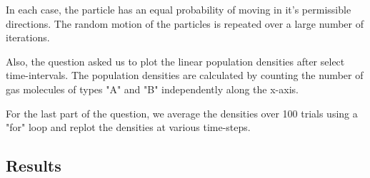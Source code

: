 \documentclass[11pt, oneside]{article}   	%
\begin{document}
In each case, the particle has an equal probability of moving in it's permissible directions. The random motion of the particles is repeated over a large number of iterations.

Also, the question asked us to plot the linear population densities after select time-intervals. The population densities are calculated by counting the number of gas molecules of types "A" and "B" independently along the x-axis.

For the last part of the question, we average the densities over 100 trials using a "for" loop and replot the densities at various time-steps.

\subsection{Results}
\end{document}
